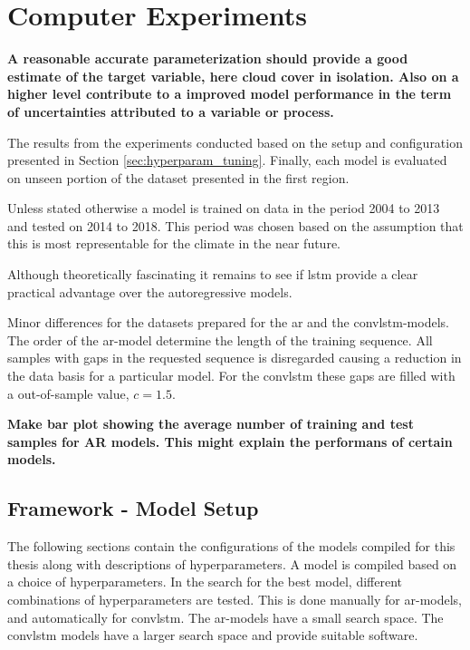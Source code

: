 \chapter{Computer Experiments} \label{ch:computer_experiments}

\textbf{A reasonable accurate parameterization should provide a good estimate of the target variable, here cloud cover in isolation. 
Also on a higher level contribute to a improved model performance in the term of uncertainties attributed to a variable or process.}

The results from the experiments conducted based on the setup and configuration presented in Section \ref{sec:hyperparam_tuning}. Finally, each model is evaluated on unseen portion of the dataset presented in the first region.

Unless stated otherwise a model is trained on data in the period 2004 to 2013 and tested on 2014 to 2018. This period was chosen based on the assumption that this is most representable for the climate in the near future.

Although theoretically fascinating it remains to see if \acrshort{lstm} provide a clear practical advantage over the autoregressive models.

Minor differences for the datasets prepared for the \acrshort{ar} and the \acrshort{convlstm}-models. The order of the \acrshort{ar}-model determine the length of the training sequence. All samples with gaps in the requested sequence is disregarded causing a reduction in the data basis for a particular model. For the \acrshort{convlstm} these gaps are filled with a out-of-sample value, $c=1.5$.

\textbf{Make bar plot showing the average number of training and test samples for AR models. This might explain the performans of certain models. }



\section{Framework - Model Setup}
The following sections contain the configurations of the models compiled for this thesis along with descriptions of hyperparameters. A model is compiled based on a choice of hyperparameters. In the search for the best model, different combinations of hyperparameters are tested. This is done manually for \acrshort{ar}-models, and automatically for \acrshort{convlstm}. The \acrshort{ar}-models have a small search space. The \acrshort{convlstm} models have a larger search space and  provide suitable software. 


